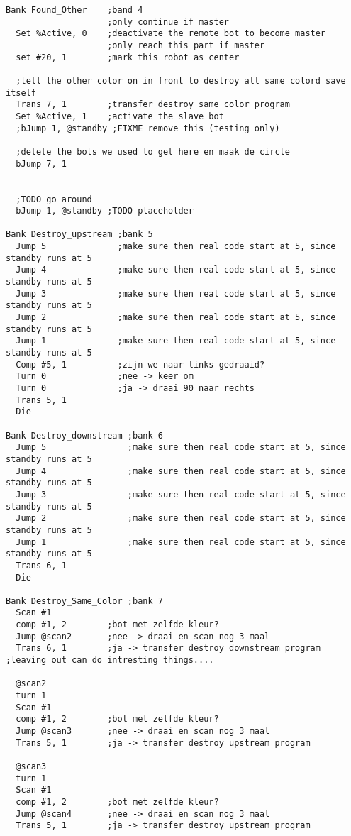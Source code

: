 \documentclass[10pt]{article}
\begin{document}
\begin{verbatim}
Bank Found_Other    ;band 4
                    ;only continue if master
  Set %Active, 0    ;deactivate the remote bot to become master
                    ;only reach this part if master
  set #20, 1        ;mark this robot as center
  
  ;tell the other color on in front to destroy all same colord save itself
  Trans 7, 1        ;transfer destroy same color program
  Set %Active, 1    ;activate the slave bot
  ;bJump 1, @standby ;FIXME remove this (testing only)
  
  ;delete the bots we used to get here en maak de circle
  bJump 7, 1
     
  
  ;TODO go around
  bJump 1, @standby ;TODO placeholder

Bank Destroy_upstream ;bank 5
  Jump 5              ;make sure then real code start at 5, since standby runs at 5
  Jump 4              ;make sure then real code start at 5, since standby runs at 5
  Jump 3              ;make sure then real code start at 5, since standby runs at 5
  Jump 2              ;make sure then real code start at 5, since standby runs at 5
  Jump 1              ;make sure then real code start at 5, since standby runs at 5
  Comp #5, 1          ;zijn we naar links gedraaid?
  Turn 0              ;nee -> keer om
  Turn 0              ;ja -> draai 90 naar rechts
  Trans 5, 1
  Die

Bank Destroy_downstream ;bank 6
  Jump 5                ;make sure then real code start at 5, since standby runs at 5
  Jump 4                ;make sure then real code start at 5, since standby runs at 5
  Jump 3                ;make sure then real code start at 5, since standby runs at 5
  Jump 2                ;make sure then real code start at 5, since standby runs at 5
  Jump 1                ;make sure then real code start at 5, since standby runs at 5
  Trans 6, 1
  Die
  
Bank Destroy_Same_Color ;bank 7
  Scan #1
  comp #1, 2        ;bot met zelfde kleur?
  Jump @scan2       ;nee -> draai en scan nog 3 maal
  Trans 6, 1        ;ja -> transfer destroy downstream program ;leaving out can do intresting things....
  
  @scan2
  turn 1
  Scan #1
  comp #1, 2        ;bot met zelfde kleur?
  Jump @scan3       ;nee -> draai en scan nog 3 maal
  Trans 5, 1        ;ja -> transfer destroy upstream program 

  @scan3
  turn 1
  Scan #1
  comp #1, 2        ;bot met zelfde kleur?
  Jump @scan4       ;nee -> draai en scan nog 3 maal
  Trans 5, 1        ;ja -> transfer destroy upstream program 


\end{verbatim}
\end{document}
